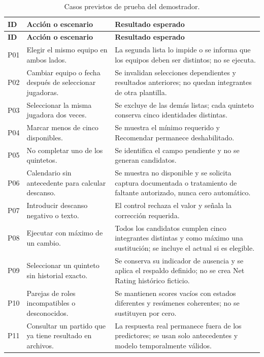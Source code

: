 \begingroup\small{}\setlength{\tabcolsep}{4pt}
\begin{longtable}{@{}>{\raggedright\arraybackslash}p{1.1cm}>{\raggedright\arraybackslash}p{4.7cm}>{\raggedright\arraybackslash}p{8.8cm}@{}}
\caption{Casos previstos de prueba del demostrador.}\label{tab:pruebas-demostrador}\\
\toprule\textbf{ID}&\textbf{Acción o escenario}&\textbf{Resultado esperado}\\\midrule\endfirsthead
\toprule\textbf{ID}&\textbf{Acción o escenario}&\textbf{Resultado esperado}\\\midrule\endhead
\bottomrule\endfoot
P01 & Elegir el mismo equipo en ambos lados. & La segunda lista lo impide o se informa que los equipos deben ser distintos; no se ejecuta.\\
P02 & Cambiar equipo o fecha después de seleccionar jugadoras. & Se invalidan selecciones dependientes y resultados anteriores; no quedan integrantes de otra plantilla.\\
P03 & Seleccionar la misma jugadora dos veces. & Se excluye de las demás listas; cada quinteto conserva cinco identidades distintas.\\
P04 & Marcar menos de cinco disponibles. & Se muestra el mínimo requerido y Recomendar permanece deshabilitado.\\
P05 & No completar uno de los quintetos. & Se identifica el campo pendiente y no se generan candidatos.\\
P06 & Calendario sin antecedente para calcular descanso. & Se muestra no disponible y se solicita captura documentada o tratamiento de faltante autorizado, nunca cero automático.\\
P07 & Introducir descanso negativo o texto. & El control rechaza el valor y señala la corrección requerida.\\
P08 & Ejecutar con máximo de un cambio. & Todos los candidatos cumplen cinco integrantes distintas y como máximo una sustitución; se incluye el actual si es elegible.\\
P09 & Seleccionar un quinteto sin historial exacto. & Se conserva su indicador de ausencia y se aplica el respaldo definido; no se crea Net Rating histórico ficticio.\\
P10 & Parejas de roles incompatibles o desconocidos. & Se mantienen scores vacíos con estados diferentes y resúmenes coherentes; no se sustituyen por cero.\\
P11 & Consultar un partido que ya tiene resultado en archivos. & La respuesta real permanece fuera de los predictores; se usan solo antecedentes y modelo temporalmente válidos.\\

\end{longtable}
